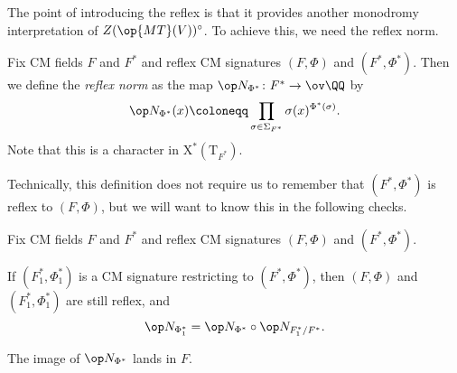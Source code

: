 \documentclass[../thesis.tex]{subfiles}
\begin{document}
The point of introducing the reflex is that it provides another monodromy interpretation of $Z(\op{MT}(V))^\circ$. To achieve this, we need the reflex norm.
\begin{definition}
	Fix CM fields $F$ and $F^*$ and reflex CM signatures $(F,\Phi)$ and $(F^*,\Phi^*)$. Then we define the \textit{reflex norm} as the map $\op N_{\Phi^*}\colon F^*\to\ov\QQ$ by
	\[\op N_{\Phi^*}(x)\coloneqq\prod_{\sigma\in\Sigma_{F^*}}\sigma(x)^{\Phi^*(\sigma)}.\]
	Note that this is a character in $\mathrm X^*(\mathrm T_{F^*})$.
\end{definition}
Technically, this definition does not require us to remember that $(F^*,\Phi^*)$ is reflex to $(F,\Phi)$, but we will want to know this in the following checks.
\begin{lemma} \label{lem:reflex-norm-descends}
	Fix CM fields $F$ and $F^*$ and reflex CM signatures $(F,\Phi)$ and $(F^*,\Phi^*)$.
	\begin{listalph}
		\item If $(F_1^*,\Phi^*_1)$ is a CM signature restricting to $(F^*,\Phi^*)$, then $(F,\Phi)$ and $(F_1^*,\Phi_1^*)$ are still reflex, and
		\[{\op N_{\Phi_1^*}}={\op N_{\Phi^*}}\circ{\op N_{F_1^*/F^*}}.\]
		\item The image of $\op N_{\Phi^*}$ lands in $F$.
	\end{listalph}
\end{lemma}
\end{document}
